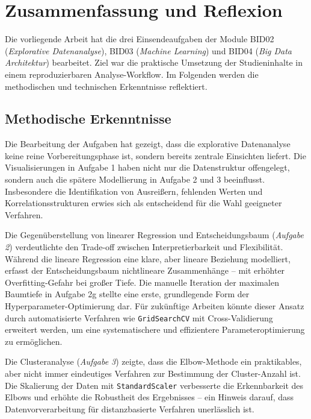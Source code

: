 
\chapter{Zusammenfassung und Reflexion}
\label{chap:zusammenfassung}
\thispagestyle{fancy}

Die vorliegende Arbeit hat die drei Einsendeaufgaben der Module BID02 (\textit{Explorative Datenanalyse}), BID03 (\textit{Machine Learning}) und BID04 (\textit{Big Data Architektur}) bearbeitet. Ziel war die praktische Umsetzung der Studieninhalte in einem reproduzierbaren Analyse-Workflow. Im Folgenden werden die methodischen und technischen Erkenntnisse reflektiert.

\section{Methodische Erkenntnisse}

Die Bearbeitung der Aufgaben hat gezeigt, dass die explorative Datenanalyse keine reine Vorbereitungsphase ist, sondern bereits zentrale Einsichten liefert. Die Visualisierungen in Aufgabe 1 haben nicht nur die Datenstruktur offengelegt, sondern auch die spätere Modellierung in Aufgabe 2 und 3 beeinflusst. Insbesondere die Identifikation von Ausreißern, fehlenden Werten und Korrelationsstrukturen erwies sich als entscheidend für die Wahl geeigneter Verfahren.

Die Gegenüberstellung von linearer Regression und Entscheidungsbaum (\textit{Aufgabe 2}) verdeutlichte den Trade-off zwischen Interpretierbarkeit und Flexibilität. Während die lineare Regression eine klare, aber lineare Beziehung modelliert, erfasst der Entscheidungsbaum nichtlineare Zusammenhänge – mit erhöhter Overfitting-Gefahr bei großer Tiefe. Die manuelle Iteration der maximalen Baumtiefe in Aufgabe 2g stellte eine erste, grundlegende Form der Hyperparameter-Optimierung dar. Für zukünftige Arbeiten könnte dieser Ansatz durch automatisierte Verfahren wie \texttt{GridSearchCV} mit Cross-Validierung erweitert werden, um eine systematischere und effizientere Parameteroptimierung zu ermöglichen.

Die Clusteranalyse (\textit{Aufgabe 3}) zeigte, dass die Elbow-Methode ein praktikables, aber nicht immer eindeutiges Verfahren zur Bestimmung der Cluster-Anzahl ist. Die Skalierung der Daten mit \texttt{StandardScaler} verbesserte die Erkennbarkeit des Elbows und erhöhte die Robustheit des Ergebnisses – ein Hinweis darauf, dass Datenvorverarbeitung für distanzbasierte Verfahren unerlässlich ist.

